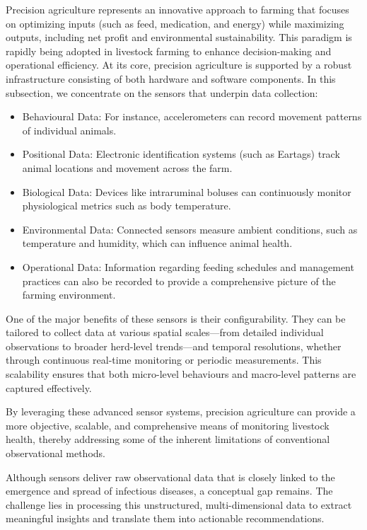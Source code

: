 Precision agriculture represents an innovative approach to farming that focuses on optimizing inputs (such as feed, medication, and energy) while maximizing outputs, including net profit and environmental sustainability. This paradigm is rapidly being adopted in livestock farming to enhance decision-making and operational efficiency. At its core, precision agriculture is supported by a robust infrastructure consisting of both hardware and software components. In this subsection, we concentrate on the sensors that underpin data collection:


\begin{itemize}
    \item Behavioural Data: For instance, accelerometers can record movement patterns of individual animals.
    \item Positional Data: Electronic identification systems (such as Eartags) track animal locations and movement across the farm.
    \item Biological Data: Devices like intraruminal boluses can continuously monitor physiological metrics such as body temperature.
    \item Environmental Data: Connected sensors measure ambient conditions, such as temperature and humidity, which can influence animal health.
    \item Operational Data: Information regarding feeding schedules and management practices can also be recorded to provide a comprehensive picture of the farming environment.
\end{itemize}

One of the major benefits of these sensors is their configurability. They can be tailored to collect data at various spatial scales—from detailed individual observations to broader herd-level trends—and temporal resolutions, whether through continuous real-time monitoring or periodic measurements. This scalability ensures that both micro-level behaviours and macro-level patterns are captured effectively. 

By leveraging these advanced sensor systems, precision agriculture can provide a more objective, scalable, and comprehensive means of monitoring livestock health, thereby addressing some of the inherent limitations of conventional observational methods.

Although sensors deliver raw observational data that is closely linked to the emergence and spread of infectious diseases, a conceptual gap remains. The challenge lies in processing this unstructured, multi-dimensional data to extract meaningful insights and translate them into actionable recommendations.

